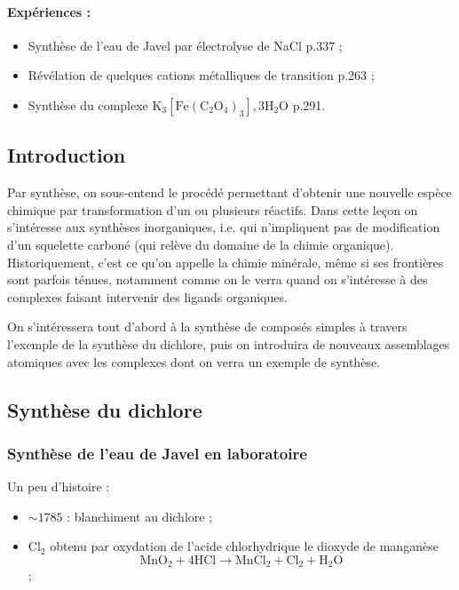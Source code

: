 \paragraph{Expériences :}
\begin{itemize}
\item Synthèse de l'eau de Javel par électrolyse de NaCl \cite{Cachau-Hereillat2011} p.337 ;
\item Révélation de quelques cations métalliques de transition \cite{Buchere2017} p.263 ;
\item Synthèse du complexe $\mathrm{K_3[Fe(C_2O_4)_3],3H_2O}$ \cite{Buchere2017} p.291.
\end{itemize}


\subsection{Introduction}

Par synthèse, on sous-entend le procédé permettant d'obtenir une nouvelle espèce chimique par transformation d'un ou plusieurs réactifs. 
Dans cette leçon on s'intéresse aux synthèses inorganiques, i.e. qui n'impliquent pas de modification d'un squelette carboné (qui relève du domaine de la chimie organique).
Historiquement, c'est ce qu'on appelle la chimie minérale, même si ses frontières sont parfois ténues, notamment comme on le verra quand on s'intéresse à des complexes faisant intervenir des ligands organiques.

On s'intéressera tout d'abord à la synthèse de composés simples à travers l'exemple de la synthèse du dichlore, puis on introduira de nouveaux assemblages atomiques avec les complexes dont on verra un exemple de synthèse.

\subsection{Synthèse du dichlore}

\subsubsection{Synthèse de l'eau de Javel en laboratoire}

Un peu d'histoire :
\begin{itemize}
\item $\sim 1785$ : blanchiment au dichlore ;
\item $\mathrm{Cl_2}$ obtenu par oxydation de l'acide chlorhydrique le dioxyde de manganèse $$\mathrm{MnO_2 + 4HCl \rightarrow MnCl_2 + Cl_2 + H_2O}$$;
\end{itemize} 

